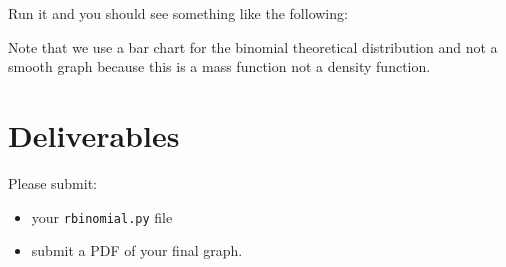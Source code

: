 \begin{fullwidth}
\step Run it and you should see something like the following:


Note that we use a bar chart for the binomial theoretical distribution and not a smooth graph because this is a mass function not a density function.

\section{Deliverables}

Please submit:

\begin{itemize}
\item your {\tt rbinomial.py} file
\item submit a PDF of your final graph.
\end{itemize}

\end{fullwidth}
